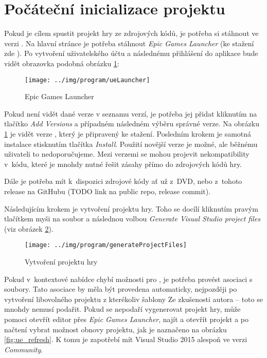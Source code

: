 
\section{Počáteční inicializace projektu}

Pokud je cílem spustit projekt hry ze zdrojových kódů, je potřeba si stáhnout \UE{} ve verzi . Na hlavní stránce \UE{} je potřeba stáhnout \textit{Epic Games Launcher} (ke stažení zde \citep{ue_download}). Po vytvoření uživatelského účtu a následnému přihlášení do aplikace bude vidět obrazovka podobná obrázku \ref{fig:ueLauncher}:


\begin{figure}[!ht]\centering
\texttt{[image: ../img/program/ueLauncher]}

\caption{Epic Games Launcher}
\label{fig:ueLauncher}

\end{figure}

\FloatBarrier

Pokud není vidět \UE{} dané verze v seznamu verzí, je potřeba jej přidat kliknutím na tlačítko \textit{Add Versions} a případném následném výběru správné verze. Na obrázku \ref{fig:ueLauncher} je vidět \UE{} verze , který je připravený ke stažení. Posledním krokem je samotná instalace stisknutím tlačítka \textit{Install}. Použití novější verze \UEu{} je možné, ale běžnému uživateli to nedoporučujeme. Mezi verzemi se mohou projevit nekompatibility v~kódu, které je mnohdy nutné řešit zásahy přímo do zdrojových kódů hry.

Dále je potřeba mít k~dispozici zdrojové kódy ať už z~DVD, nebo z~tohoto release na GitHubu (TODO link na public repo, release commit).
 
Následujícím krokem je vytvoření projektu hry. Toho se docílí kliknutím pravým tlačítkem myši na soubor  a následnou volbou \textit{Generate Visual Studio project files} (viz obrázek \ref{fig:generateProjectFiles}). 

\begin{figure}[!ht]\centering
\texttt{[image: ../img/program/generateProjectFiles]}

\caption{Vytvoření projektu hry}
\label{fig:generateProjectFiles}

\end{figure}

\FloatBarrier


Pokud v~kontextové nabídce chybí možnosti pro \UE{}, je potřeba provést asociaci s  soubory. Tato asociace by měla být provedena automaticky, nejpozději po vytvoření libovolného \CPP{} projektu z kterékoliv šablony Ze zkušenosti autora -- toto se mnohdy nemusí podařit. Pokud se nepodaří vygenerovat projekt hry, může pomoci otevřít editor přes \textit{Epic Games Launcher}, najít a otevřít projekt a po načtení vybrat možnost obnovy projektu, jak je naznačeno na obrázku \ref{fig:ue_refresh}. K tomu je zapotřebí mít Visual Studio 2015 alespoň ve verzi \textit{Community}.


